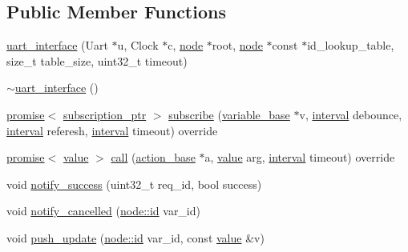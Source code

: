 \subsection*{Public Member Functions}
\begin{DoxyCompactItemize}
\item 
\hyperlink{classtelegen_1_1uart__interface_a94948855fab15839bd7af6325b7de8ab}{uart\+\_\+interface} (Uart $\ast$u, Clock $\ast$c, \hyperlink{classtelegen_1_1node}{node} $\ast$root, \hyperlink{classtelegen_1_1node}{node} $\ast$const $\ast$id\+\_\+lookup\+\_\+table, size\+\_\+t table\+\_\+size, uint32\+\_\+t timeout)
\item 
\hyperlink{classtelegen_1_1uart__interface_a32429e63defd2d534b5d881eeff8c35c}{$\sim$uart\+\_\+interface} ()
\item 
\hyperlink{namespacetelegen_a9dd802bb5d30cf96b0c616750d43ae86}{promise}$<$ \hyperlink{namespacetelegen_a27c822534a5231fe1c523c81e8768afb}{subscription\+\_\+ptr} $>$ \hyperlink{classtelegen_1_1uart__interface_a869d06375865913880cf9818150c5b6e}{subscribe} (\hyperlink{classtelegen_1_1variable__base}{variable\+\_\+base} $\ast$v, \hyperlink{namespacetelegen_ad925de2d0a99bc43918533abf0457344}{interval} debounce, \hyperlink{namespacetelegen_ad925de2d0a99bc43918533abf0457344}{interval} referesh, \hyperlink{namespacetelegen_ad925de2d0a99bc43918533abf0457344}{interval} timeout) override
\item 
\hyperlink{namespacetelegen_a9dd802bb5d30cf96b0c616750d43ae86}{promise}$<$ \hyperlink{classtelegen_1_1value}{value} $>$ \hyperlink{classtelegen_1_1uart__interface_acaf4ff8f9442b3d4d2b9d5bcc252d08e}{call} (\hyperlink{classtelegen_1_1action__base}{action\+\_\+base} $\ast$a, \hyperlink{classtelegen_1_1value}{value} arg, \hyperlink{namespacetelegen_ad925de2d0a99bc43918533abf0457344}{interval} timeout) override
\item 
void \hyperlink{classtelegen_1_1uart__interface_a4552980fe3db33e65c631c785fa7b743}{notify\+\_\+success} (uint32\+\_\+t req\+\_\+id, bool success)
\item 
void \hyperlink{classtelegen_1_1uart__interface_a62a2abc8dd84e273c18e4d6f123253dc}{notify\+\_\+cancelled} (\hyperlink{classtelegen_1_1node_aae3ff0d12932c55fdc88a1743e27ea56}{node\+::id} var\+\_\+id)
\item 
void \hyperlink{classtelegen_1_1uart__interface_a27ccf80b5783baaa49300f27f061bd9f}{push\+\_\+update} (\hyperlink{classtelegen_1_1node_aae3ff0d12932c55fdc88a1743e27ea56}{node\+::id} var\+\_\+id, const \hyperlink{classtelegen_1_1value}{value} \&v)

\end{DoxyCompactItemize}
